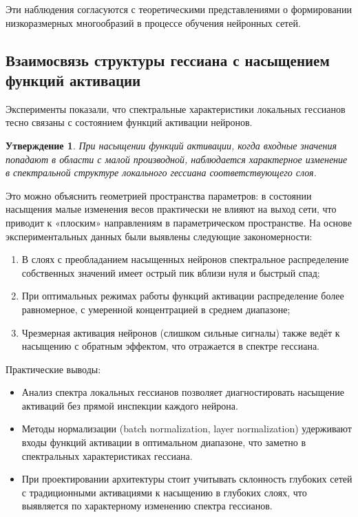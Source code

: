 \documentclass[a4paper,12pt]{article}
\newtheorem{proposition}{Утверждение}
\begin{document}
Эти наблюдения согласуются с теоретическими представлениями о формировании низкоразмерных многообразий в
процессе обучения нейронных сетей.

\subsection{Взаимосвязь структуры гессиана с насыщением функций активации}
Эксперименты показали, что спектральные характеристики локальных гессианов тесно связаны с состоянием функций
активации нейронов.

\begin{proposition}
  При насыщении функций активации, когда входные значения попадают в области с малой производной, наблюдается
  характерное изменение в спектральной структуре локального гессиана соответствующего слоя.
\end{proposition}

Это можно объяснить геометрией пространства параметров: в состоянии насыщения малые изменения весов
практически не влияют на выход сети, что приводит к «плоским» направлениям в параметрическом пространстве. На
основе экспериментальных данных были выявлены следующие закономерности:
\begin{enumerate}
  \item В слоях с преобладанием насыщенных нейронов спектральное распределение собственных значений имеет
    острый пик вблизи нуля и быстрый спад;
  \item При оптимальных режимах работы функций активации распределение более равномерное, с умеренной
    концентрацией в среднем диапазоне;
  \item Чрезмерная активация нейронов (слишком сильные сигналы) также ведёт к насыщению с обратным эффектом,
    что отражается в спектре гессиана.
\end{enumerate}

Практические выводы:
\begin{itemize}
  \item Анализ спектра локальных гессианов позволяет диагностировать насыщение активаций без прямой инспекции
    каждого нейрона.
  \item Методы нормализации (batch normalization, layer normalization) удерживают входы функций активации в
    оптимальном диапазоне, что заметно в спектральных характеристиках гессиана.
  \item При проектировании архитектуры стоит учитывать склонность глубоких сетей с традиционными активациями
    к насыщению в глубоких слоях, что выявляется по характерному изменению спектра гессианов.
\end{itemize}
\end{document}
